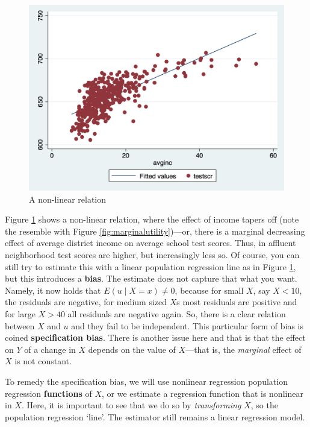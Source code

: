 \documentclass[
]{book}
\begin{document}
\begin{figure}

{\centering \includegraphics[width=600px]{./figures/scatterincome} 

}

\caption{A non-linear relation}\label{fig:scatterincome}
\end{figure}

Figure \ref{fig:scatterincome} shows a non-linear relation, where the effect of income tapers off (note the resemble with Figure \ref{fig:marginalutility})---or, there is a marginal decreasing effect of average district income on average school test scores. Thus, in affluent neighborhood test scores are higher, but increasingly less so. Of course, you can still try to estimate this with a linear population regression line as in Figure \ref{fig:scatterincome}, but this introduces a \textbf{bias}. The estimate does not capture that what you want. Namely, it now holds that \(E(u \mid X = x) \neq 0\), because for small \(X\), say \(X<10\), the residuals are negative, for medium sized \(X\)s most residuals are positive and for large \(X>40\) all residuals are negative again. So, there is a clear relation between \(X\) and \(u\) and they fail to be independent. This particular form of bias is coined \textbf{specification bias}. There is another issue here and that is that the effect on \(Y\) of a change in \(X\) depends on the value of \(X\)---that is, the \emph{marginal} effect of \(X\) is not constant.

To remedy the specification bias, we will use nonlinear regression population regression \textbf{functions} of \(X\), or we estimate a regression function that is nonlinear in \(X\). Here, it is important to see that we do so by \emph{transforming} \(X\), so the population regression `line'. The estimator still remains a linear regression model.
\end{document}
